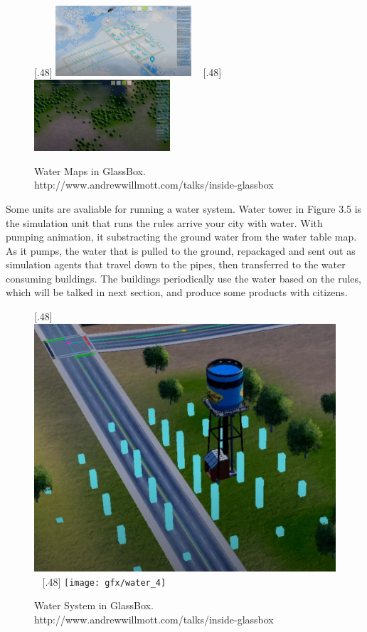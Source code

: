 \begin{figure}[htb]
	\centering	
	[.48\linewidth]{
		\includegraphics[width=0.45\textwidth]{gfx/water_1} 	
	}  	
	~
	[.48\linewidth]{
		\includegraphics[width=0.45\textwidth]{gfx/water_2}  	
	}	  
	
	\caption{Water Maps in GlassBox.\\ http://www.andrewwillmott.com/talks/inside-glassbox}
	\label{fig:ex_5}
\end{figure}

Some units are avaliable for running a water system. Water tower in Figure 3.5 is the simulation unit that runs the rules arrive your city with water. With pumping animation, it substracting the ground water from the water table map. As it pumps, the water that is pulled to the ground, repackaged and sent out as simulation agents that travel down to the pipes, then transferred to the water consuming buildings. The buildings periodically use the water based on the rules, which will be talked in next section, and produce some products with citizens.

\begin{figure}[htb]
	\centering	
	[.48\linewidth]{
		\includegraphics[height=0.25\textwidth]{gfx/water_3} 	
	}  	
	~
	[.48\linewidth]{
		\texttt{[image: gfx/water\_4]}  	
	}	  
	
	\caption{Water System in GlassBox.\\ http://www.andrewwillmott.com/talks/inside-glassbox}
	\label{fig:ex_5}
\end{figure}

